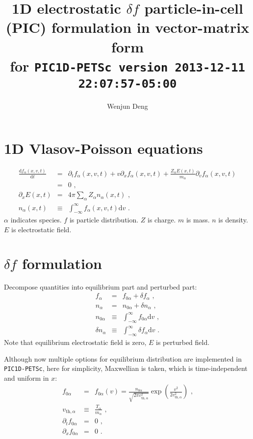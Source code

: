 \documentclass[12pt]{article}
\begin{document}
\newcommand{\md}{\mathrm{d}}
\newcommand{\me}{\mathrm{e}}

\title{1D electrostatic $\delta f$ particle-in-cell (PIC) formulation in vector-matrix form \\
\large for \texttt{PIC1D-PETSc version 2013-12-11 22:07:57-05:00}}
\author{Wenjun Deng}
\maketitle


\section{1D Vlasov-Poisson equations}

\begin{eqnarray}
	\frac{\md f_\alpha(x, v, t)}{\md t} & = & \partial_t f_\alpha(x, v, t) + v \partial_x f_\alpha(x, v, t) + \frac{Z_\alpha E(x, t)}{m_\alpha} \partial_v f_\alpha(x, v, t) \nonumber \\
	& = & 0 \textrm{ ,} \\
	\partial_x E(x, t) & = & 4 \pi \sum_\alpha Z_\alpha n_\alpha(x, t) \textrm{ ,} \\
	n_\alpha(x, t) & \equiv & \int_{-\infty}^{\infty} f_\alpha(x, v, t) \md v \textrm{ .}
\end{eqnarray}
$\alpha$ indicates species.
$f$ is particle distribution.
$Z$ is charge.
$m$ is mass.
$n$ is density.
$E$ is electrostatic field.


\section{$\delta f$ formulation}

Decompose quantities into equilibrium part and perturbed part:
\begin{eqnarray}
	f_\alpha & = & f_{0 \alpha} + \delta f_\alpha \textrm{ ,} \\
	n_\alpha & = & n_{0 \alpha} + \delta n_\alpha \textrm{ ,} \\
	n_{0 \alpha} & \equiv & \int_{-\infty}^{\infty} f_{0 \alpha} \md v \textrm{ ,} \\
	\delta n_{\alpha} & \equiv & \int_{-\infty}^{\infty} \delta f_{\alpha} \md v \textrm{ .}
\end{eqnarray}
Note that equilibrium electrostatic field is zero, $E$ is perturbed field.

Although now multiple options for equilibrium distribution are implemented in \texttt{PIC1D-PETSc}, here for simplicity, Maxwellian is taken, which is time-independent and uniform in $x$:
\begin{eqnarray}
	f_{0 \alpha} & = & f_{0 \alpha}(v) = \frac{n_{0 \alpha}}{\sqrt{2 \pi v_{\mathrm{th}, \alpha}^2}} \exp \left( \frac{v^2}{2 v_{\mathrm{th}, \alpha}^2} \right) \textrm{ ,} \\
	v_{\mathrm{th}, \alpha} & \equiv & \frac{T_\alpha}{m_\alpha} \textrm{ ,} \\
	\partial_t f_{0 \alpha} & = & 0 \textrm{ ,} \\
	\partial_x f_{0 \alpha} & = & 0 \textrm{ .}
\end{eqnarray}
\end{document}
